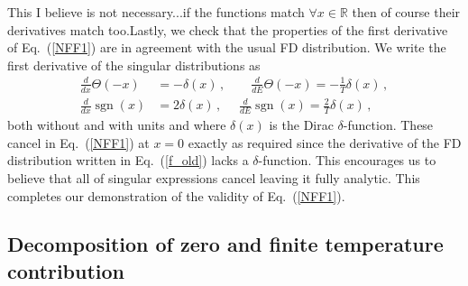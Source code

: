 \documentclass[sn-mathphys,Numbered]{sn-jnl}
\newcommand{\req}[1]{Eq.~(\ref{#1})}
\newcommand{\rf}[1]{Fig.~{\ref{#1}}}
\newcommand*{\MeV}{\text{ MeV}}
\DeclareMathOperator{\sgn}{sgn}
\newcommand{\rev}[1]{{\color{blue}#1}}
\begin{document}
\rev{This I believe is not necessary...if the functions match $\forall x \in \mathbb{R}$ then of course their derivatives match too.}Lastly, we check that the properties of the first derivative of \req{NFF1} are in agreement with the usual FD distribution. We write the first derivative of the singular distributions as 
\begin{align}
\label{NFF1b}
\frac{d}{dx}\Theta(-x)&=-\delta(x)\,,\qquad 
\frac{d}{dE}\Theta(-x)=-\frac{1}{T}\delta(x)\,,\\
\frac{d}{dx}\sgn(x)&=2\delta(x)\,,\,\,\quad 
\frac{d}{dE}\sgn(x)=\frac{2}{T}\delta(x)\,,
\end{align}
both without and with units and where $\delta(x)$ is the Dirac $\delta$-function. These cancel in \req{NFF1} at $x=0$ exactly as required since the derivative of the FD distribution written in \req{f_old} lacks a $\delta$-function. This encourages us to believe that all of singular expressions cancel leaving it fully analytic. This completes our demonstration of the validity of \req{NFF1}.

\subsection{Decomposition of zero and finite temperature contribution}
\label{Numerical}

\end{document}
